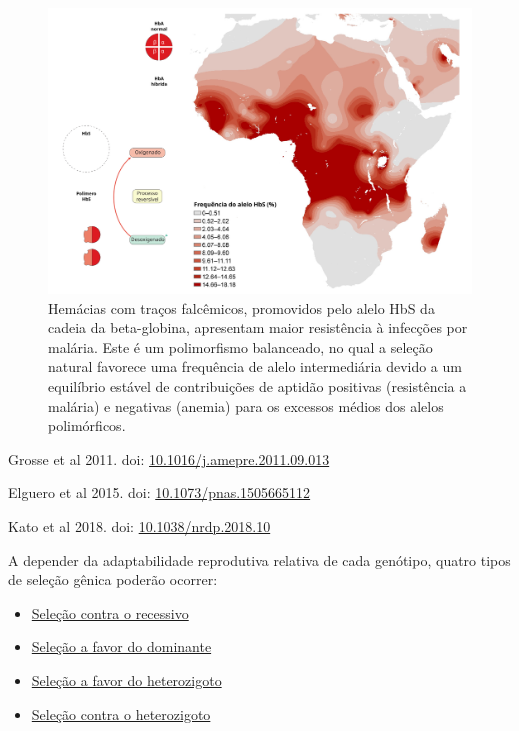 \documentclass[
]{book}
\begin{document}
\begin{figure}

{\centering \includegraphics[width=600px]{figs/HbS_structure_frequency} 

}

\caption{Hemácias com traços falcêmicos, promovidos pelo alelo HbS da cadeia da beta-globina, apresentam maior resistência à infecções por malária. Este é um polimorfismo balanceado, no qual a seleção natural favorece uma frequência de alelo intermediária devido a um equilíbrio estável de contribuições de aptidão positivas (resistência a malária) e negativas (anemia) para os excessos médios dos alelos polimórficos.}\label{fig:HbS}
\end{figure}

Grosse et al 2011. doi: \href{https://doi.org/10.1016/j.amepre.2011.09.013}{10.1016/j.amepre.2011.09.013}

Elguero et al 2015. doi: \href{https://doi.org/10.1073/pnas.1505665112}{10.1073/pnas.1505665112}

Kato et al 2018. doi: \href{https://doi.org/10.1038/nrdp.2018.10}{10.1038/nrdp.2018.10}

A depender da adaptabilidade reprodutiva relativa de cada genótipo, quatro tipos de seleção gênica poderão ocorrer:

\begin{itemize}
\item
  \protect\hyperlink{seleuxe7uxe3o-contra-o-recessivo}{Seleção contra o recessivo}
\item
  \protect\hyperlink{seleuxe7uxe3o-a-favor-do-dominante}{Seleção a favor do dominante}
\item
  \protect\hyperlink{seleuxe7uxe3o-a-favor-do-heterozigoto}{Seleção a favor do heterozigoto}
\item
  \protect\hyperlink{seleuxe7uxe3o-contra-o-heterozigoto}{Seleção contra o heterozigoto}
\end{itemize}
\end{document}
